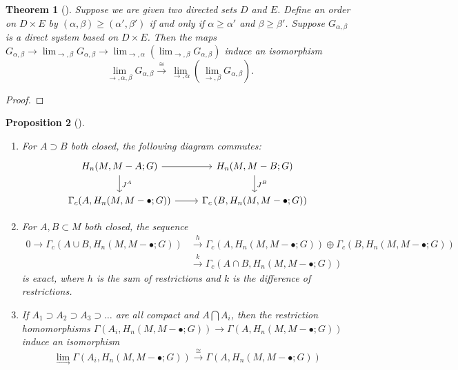 \documentclass[reqno]{amsart}
\newtheorem{theorem}{Theorem}[section]
\newtheorem{proposition}[theorem]{Proposition}
\theoremstyle{definition}
\theoremstyle{remark}
\begin{document}
\begin{theorem}[]
    Suppose we are given two directed sets
    $D$ and $E$. Define an order on
    $D \times E$ by 
    $\left( \alpha, \beta \right) \ge 
    \left( \alpha', \beta' \right) $ if and only if
    $\alpha \ge \alpha'$ and
    $\beta \ge  \beta'$. Suppose
    $G_{\alpha, \beta}$ is a direct system
    based on $D \times E$. Then the maps
    $G_{\alpha,\beta} \to 
    \lim_{\rightarrow, \beta} G_{\alpha, \beta}
    \to \lim_{\rightarrow, \alpha}
    \left( \lim_{\rightarrow, \beta} G_{\alpha,\beta} \right) $
    induce an isomorphism
    \[
    \lim_{\rightarrow, \alpha,\beta} G_{\alpha, \beta}
    \stackrel{\cong}{\to} 
    \lim_{\rightarrow, \alpha} \left( 
    \lim_{\rightarrow, \beta} 
G_{\alpha, \beta}\right) .
    \]  
\end{theorem}

\begin{proof}
    \todo{}
\end{proof}

\begin{proposition}[]\label{Prop:SIDJOXOLLWQU}
    \begin{enumerate}
        \item 
    For $A \supset B$ both closed, the following
    diagram commutes:
    \begin{equation*}
    \begin{tikzcd}
        H_n(M, M - A;G) \ar[r] \ar[d, "J^{A}"] &
        H_n(M, M - B ; G) \ar[d, "J^{B}"] \\
        \Gamma_c (A,
        H_n(M, M - \bullet ; G)) \ar[r] & 
        \Gamma_c \left( B,
        H_n(M, M - \bullet; G) \right) 
    \end{tikzcd}
    \end{equation*}
\item  For $A , B \subset M$ both closed, the sequence
        \begin{align*}
    0 \to \Gamma_c (A \cup B, 
    H_n(M, M - \bullet;G)) 
    &\stackrel{h}{\to} 
    \Gamma_c \left( A, H_n(M, M - \bullet;G) \right) 
    \oplus \Gamma_c \left( 
    B, H_n(M, M - \bullet; G) \right)\\
    &\stackrel{k}{\to} 
    \Gamma_c \left( A \cap B,
    H_n\left( M, M-\bullet; G \right) \right) 
        \end{align*}
    is exact, where $h$ is the sum of restrictions and
    $k$ is the difference of restrictions.
\item If $A_1 \supset A_2 \supset A_3 \supset \ldots$ are
    all compact and $A \bigcap A_i  $, then the restriction
    homomorphisms
    $\Gamma \left( A_i, H_n \left( M, M - \bullet; G \right)  \right) 
    \to \Gamma \left( A, H_n \left( M, M- \bullet; G \right) 
    \right) $ induce an isomorphism
    \[
    \lim_{\rightarrow} \Gamma
    \left( A_i, H_n\left( M, M - \bullet;G \right)  \right) 
    \stackrel{\cong}{\to} 
    \Gamma \left( A, H_n (M, M- \bullet;G) \right) 
    \] 
    \end{enumerate}
\end{proposition}
\end{document}

